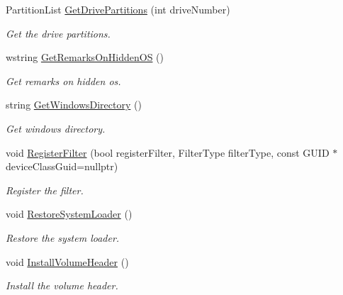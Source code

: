 \begin{DoxyCompactItemize}
Partition\+List \hyperlink{class_gost_crypt_1_1_boot_encryption_a3043ae06af0b4d63e45806ddc1458006}{Get\+Drive\+Partitions} (int drive\+Number)
\begin{DoxyCompactList}\small\item\em Get the drive partitions. \end{DoxyCompactList}\item 
wstring \hyperlink{class_gost_crypt_1_1_boot_encryption_aaca146556fbaac863e487cdabcad4678}{Get\+Remarks\+On\+Hidden\+OS} ()
\begin{DoxyCompactList}\small\item\em Get remarks on hidden os. \end{DoxyCompactList}\item 
string \hyperlink{class_gost_crypt_1_1_boot_encryption_a2faa08fabf7bd37b8ebd9e0b6b437274}{Get\+Windows\+Directory} ()
\begin{DoxyCompactList}\small\item\em Get windows directory. \end{DoxyCompactList}\item 
void \hyperlink{class_gost_crypt_1_1_boot_encryption_a6644cab53713a12bfe4998605894dd8b}{Register\+Filter} (bool register\+Filter, Filter\+Type filter\+Type, const G\+U\+ID $\ast$device\+Class\+Guid=nullptr)
\begin{DoxyCompactList}\small\item\em Register the filter. \end{DoxyCompactList}\item 
void \hyperlink{class_gost_crypt_1_1_boot_encryption_aadfca881f52d27e0f6bf271702194da3}{Restore\+System\+Loader} ()
\begin{DoxyCompactList}\small\item\em Restore the system loader. \end{DoxyCompactList}\item 
void \hyperlink{class_gost_crypt_1_1_boot_encryption_ad9957a4693a05ee0e8b4a142a7f5454c}{Install\+Volume\+Header} ()
\begin{DoxyCompactList}\small\item\em Install the volume header. \end{DoxyCompactList}\end{DoxyCompactItemize}
